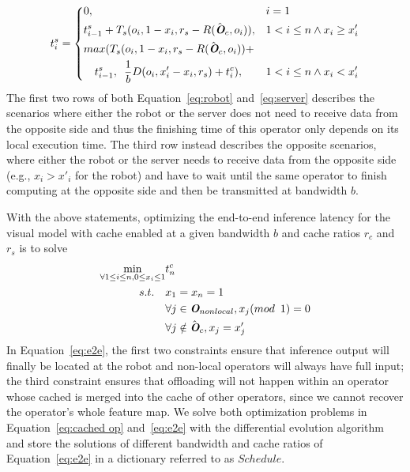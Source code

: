 \begin{equation}
    t_i^{s} = \left\{
        \begin{aligned}
            &0,&&i=1\\
            &t_{i-1}^{s} + T_s(o_i, 1-x_i, r_s-R(\hat{\textit{\textbf{O}}}_c, o_i)),&&1<i\le n \land x_i\ge x'_i \\
            &max(T_s(o_i, 1-x_i, r_s-R(\hat{\textit{\textbf{O}}}_c, o_i)) + \\
            & \enspace \enspace t_{i-1}^{s}, \enspace \frac{1}{b} D(o_i, x'_i-x_i,r_s)+ t_i^{c}),&&1<i\le n \land x_i<x'_i
        \end{aligned}
    \right.
    \label{eq:server}
\end{equation}
The first two rows of both Equation~\ref{eq:robot} and~\ref{eq:server} describes the scenarios where either the robot or the server does not need to receive data from the opposite side and thus the finishing time of this operator only depends on its local execution time.
The third row instead describes the opposite scenarios, where either the robot or the server needs to receive data from the opposite side (e.g., $x_i > x'_i$ for the robot) and have to wait until the same operator to finish computing at the opposite side and then be transmitted at bandwidth $b$.

With the above statements, optimizing the end-to-end inference latency for the visual model with cache enabled at a given bandwidth $b$ and cache ratios $r_c$ and $r_s$ is to solve
\begin{equation}
    \begin{aligned}
        \min\limits_{\forall 1\le i \le n, 0\le x_i\le 1} & t_n^{c} \\
         s.t. \enspace \enspace&  x_1 = x_n = 1 \\
         & \forall j \in \textit{\textbf{O}}_{nonlocal}, x_j (mod \enspace 1) = 0 \\
         & \forall j \notin \hat{\textit{\textbf{O}}}_c, x_j = x'_j
    \end{aligned}
    \label{eq:e2e}
\end{equation}
In Equation~\ref{eq:e2e}, the first two constraints ensure that inference output will finally be located at the robot and non-local operators will always have full input; the third constraint ensures that offloading will not happen within an operator whose cached is merged into the cache of other operators, since we cannot recover the operator's whole feature map.
We solve both optimization problems in Equation~\ref{eq:cached op} and~\ref{eq:e2e} with the differential evolution algorithm~\cite{qin2008differential} and store the solutions of different bandwidth and cache ratios of Equation~\ref{eq:e2e} in a dictionary referred to as $Schedule$.

